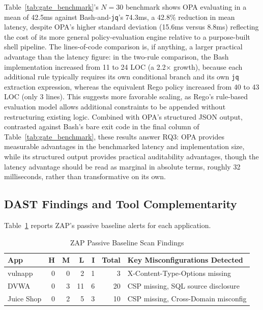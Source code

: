 \documentclass[conference]{IEEEtran}
\begin{document}
Table~\ref{tab:gate_benchmark}'s $N=30$ benchmark shows OPA evaluating in a mean of 42.5ms against Bash-and-\texttt{jq}'s 74.3ms, a 42.8\% reduction in mean latency, despite OPA's higher standard deviation (15.6ms versus 8.8ms) reflecting the cost of its more general policy-evaluation engine relative to a purpose-built shell pipeline. The lines-of-code comparison is, if anything, a larger practical advantage than the latency figure: in the two-rule comparison, the Bash implementation increased from 11 to 24 LOC (a 2.2$\times$ growth), because each additional rule typically requires its own conditional branch and its own \texttt{jq} extraction expression, whereas the equivalent Rego policy increased from 40 to 43 LOC (only 3 lines). This suggests more favorable scaling, as Rego's rule-based evaluation model allows additional constraints to be appended without restructuring existing logic. Combined with OPA's structured JSON output, contrasted against Bash's bare exit code in the final column of Table~\ref{tab:gate_benchmark}, these results answer RQ3: OPA provides measurable advantages in the benchmarked latency and implementation size, while its structured output provides practical auditability advantages, though the latency advantage should be read as marginal in absolute terms, roughly 32 milliseconds, rather than transformative on its own.

\subsection{DAST Findings and Tool Complementarity}
Table~\ref{tab:zap_findings} reports ZAP's passive baseline alerts for each application.

\begin{table}[t]
\centering
\caption{ZAP Passive Baseline Scan Findings}
\label{tab:zap_findings}
\footnotesize
\begin{tabular}{|l|r|r|r|r|r|l|}
\hline
\textbf{App} & \textbf{H} & \textbf{M} & \textbf{L} & \textbf{I} & \textbf{Total} & \textbf{Key Misconfigurations Detected} \\
\hline
vulnapp    & 0 & 0 & 2  & 1 & 3  & X-Content-Type-Options missing \\
DVWA       & 0 & 3 & 11 & 6 & 20 & CSP missing, SQL source disclosure \\
Juice Shop & 0 & 2 & 5  & 3 & 10 & CSP missing, Cross-Domain misconfig \\
\hline
\end{tabular}
\end{table}
\end{document}
